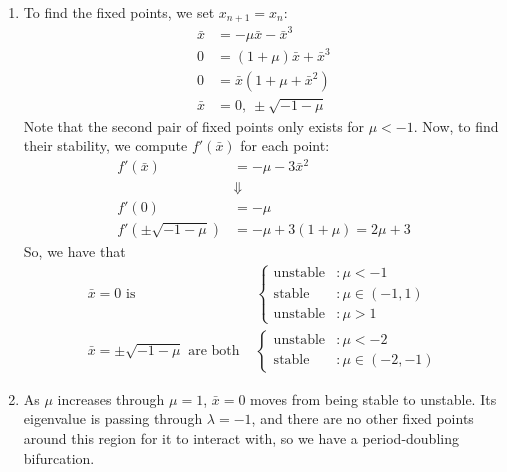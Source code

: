 \documentclass[10pt,letterpaper]{report}
\begin{document}
\begin{enumerate}
\begin{enumerate}
    \item To find the fixed points, we set $x_{n+1} = x_n:$
    \begin{align*}
        \bar x &= -\mu \bar x - \bar x^3 \\
        0 &= (1+\mu)\bar x + \bar x^3 \\
        0 &= \bar x\left(1 + \mu + \bar x^2\right) \\
        \bar x &= 0,\ \pm\sqrt{-1-\mu}
    \end{align*}
    Note that the second pair of fixed points only exists for $\mu < -1$. Now, to find their stability, we compute $f'(\bar x)$ for each point:
    \begin{align*}
        f'(\bar x) &= -\mu - 3\bar x^2 \\ 
        &\Downarrow \\
        f'(0) &= - \mu \\
        f'\left(\pm\sqrt{-1 - \mu}\right) &= -\mu + 3(1 + \mu)
        =
        2\mu + 3
    \end{align*}
    So, we have that
    \begin{align*}
        \bar x = 0 \textrm{ is }&\begin{cases}
        \textrm{unstable}&: \mu < -1 \\
        \textrm{stable} &: \mu \in (-1, 1) \\
        \textrm{unstable}&: \mu > 1
        \end{cases} \\
        \bar x = \pm \sqrt{-1-\mu} \textrm{ are both }&\begin{cases}
        \textrm{unstable}&: \mu < -2 \\
        \textrm{stable} &: \mu \in (-2, -1)
        \end{cases}
    \end{align*}
    \item As $\mu$ increases through $\mu = 1$, $\bar x = 0$ moves from being stable to unstable. Its eigenvalue is passing through $\lambda = -1$, and there are no other fixed points around this region for it to interact with, so we have a period-doubling bifurcation.
    

\end{enumerate}
\end{enumerate}
\end{document}
